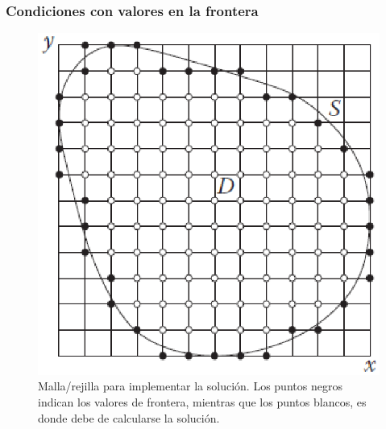 \documentclass[12pt]{beamer}
\begin{document}
\begin{frame}
\captionsetup{font=scriptsize,labelfont=scriptsize}
\frametitle{Condiciones con valores en la frontera}
\begin{figure}
    \centering
    \includegraphics[scale=0.45]{Imagenes/condicionesEDP_01.eps}
    \caption{Malla/rejilla para implementar la solución. Los puntos negros indican los valores de frontera, mientras que los puntos blancos, es donde debe de calcularse la solución.}
\end{figure}
\end{frame}
\end{document}
